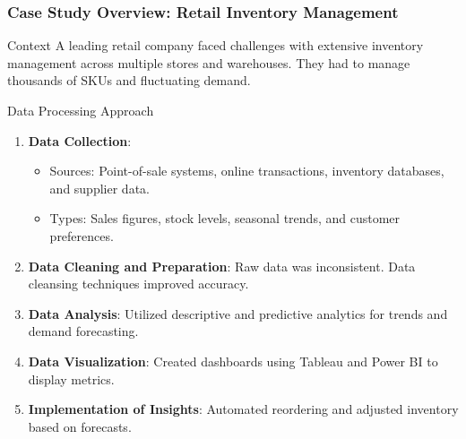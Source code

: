 \documentclass[aspectratio=169]{beamer}
\begin{document}
\begin{frame}[fragile]
    \frametitle{Case Study Overview: Retail Inventory Management}
    
    \begin{block}{Context}
        A leading retail company faced challenges with extensive inventory management across multiple stores and warehouses. They had to manage thousands of SKUs and fluctuating demand.
    \end{block}
    
    \begin{block}{Data Processing Approach}
        \begin{enumerate}
            \item \textbf{Data Collection}:
                \begin{itemize}
                    \item Sources: Point-of-sale systems, online transactions, inventory databases, and supplier data.
                    \item Types: Sales figures, stock levels, seasonal trends, and customer preferences.
                \end{itemize}
            \item \textbf{Data Cleaning and Preparation}:
                Raw data was inconsistent. Data cleansing techniques improved accuracy.
            \item \textbf{Data Analysis}:
                Utilized descriptive and predictive analytics for trends and demand forecasting.
            \item \textbf{Data Visualization}:
                Created dashboards using Tableau and Power BI to display metrics.
            \item \textbf{Implementation of Insights}:
                Automated reordering and adjusted inventory based on forecasts.
        \end{enumerate}
    \end{block}
\end{frame}
\end{document}
